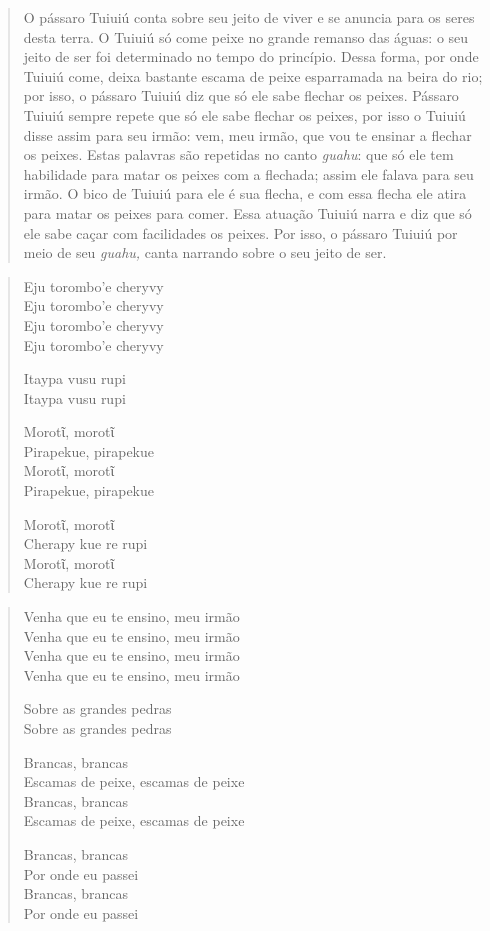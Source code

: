 \begin{quote}
O pássaro Tuiuiú conta sobre seu jeito de viver e se anuncia para os
seres desta terra. O Tuiuiú só come peixe no grande remanso das águas: o
seu jeito de ser foi determinado no tempo do princípio. Dessa forma, por
onde Tuiuiú come, deixa bastante escama de peixe esparramada na beira do
rio; por isso, o pássaro Tuiuiú diz que só ele sabe flechar os peixes.
Pássaro Tuiuiú sempre repete que só ele sabe flechar os peixes, por isso
o Tuiuiú disse assim para seu irmão: vem, meu irmão, que vou te ensinar
a flechar os peixes. Estas palavras são repetidas no canto \emph{guahu}:
que só ele tem habilidade para matar os peixes com a flechada; assim ele
falava para seu irmão. O bico de Tuiuiú para ele é sua flecha, e com
essa flecha ele atira para matar os peixes para comer. Essa atuação
Tuiuiú narra e diz que só ele sabe caçar com facilidades os peixes. Por
isso, o pássaro Tuiuiú por meio de seu \emph{guahu,} canta narrando
sobre o seu jeito de ser.
\end{quote}

\begin{verse}
Eju torombo'e cheryvy\\
Eju torombo'e cheryvy\\
Eju torombo'e cheryvy\\
Eju torombo'e cheryvy

Itaypa vusu rupi\\
Itaypa vusu rupi

Morotῖ, morotῖ\\
Pirapekue, pirapekue\\
Morotῖ, morotῖ\\
Pirapekue, pirapekue

Morotῖ, morotῖ\\
Cherapy kue re rupi\\
Morotῖ, morotῖ\\
Cherapy kue re rupi
\end{verse}

\begin{verse}
Venha que eu te ensino, meu irmão\\
Venha que eu te ensino, meu irmão\\
Venha que eu te ensino, meu irmão\\
Venha que eu te ensino, meu irmão

Sobre as grandes pedras\\
Sobre as grandes pedras

Brancas, brancas\\
Escamas de peixe, escamas de peixe\\
Brancas, brancas\\
Escamas de peixe, escamas de peixe

Brancas, brancas\\
Por onde eu passei\\
Brancas, brancas\\
Por onde eu passei
\end{verse}

